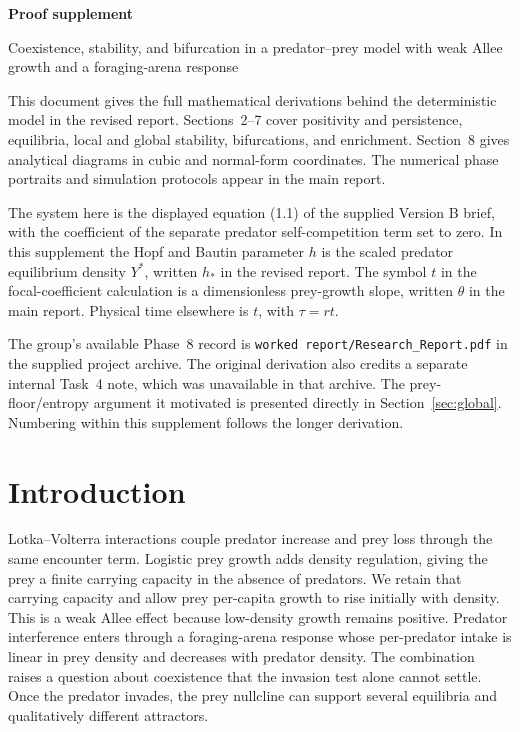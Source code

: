 \documentclass[12pt,a4paper,twoside,fleqn]{article}
\theoremstyle{journal}
\begin{document}
\thispagestyle{plain}
{\raggedright\noindent\LARGE\bfseries Proof supplement\par}
\vspace{.5em}
{\raggedright\noindent\large Coexistence, stability, and bifurcation in a predator--prey model with weak Allee growth and a foraging-arena response\par}
\vspace{1em}{\noindent Project 3H (Version B) \textbar\ Companion to the revised report\par}\vspace{1.1em}

This document gives the full mathematical derivations behind the deterministic model in the revised report. Sections~2--7 cover positivity and persistence, equilibria, local and global stability, bifurcations, and enrichment. Section~8 gives analytical diagrams in cubic and normal-form coordinates. The numerical phase portraits and simulation protocols appear in the main report.

The system here is the displayed equation (1.1) of the supplied Version B brief, with the coefficient of the separate predator self-competition term set to zero. In this supplement the Hopf and Bautin parameter \(h\) is the scaled predator equilibrium density \(Y^*\), written \(h_*\) in the revised report. The symbol \(t\) in the focal-coefficient calculation is a dimensionless prey-growth slope, written \(\theta\) in the main report. Physical time elsewhere is \(t\), with \(\tau=rt\).

The group's available Phase~8 record is \texttt{worked report/Research\_Report.pdf} in the supplied project archive. The original derivation also credits a separate internal Task~4 note, which was unavailable in that archive. The prey-floor/entropy argument it motivated is presented directly in Section~\ref{sec:global}. Numbering within this supplement follows the longer derivation.

\tableofcontents
\clearpage
\section{Introduction}
Lotka--Volterra interactions couple predator increase and prey loss through the same encounter term. Logistic prey growth adds density regulation, giving the prey a finite carrying capacity in the absence of predators. We retain that carrying capacity and allow prey per-capita growth to rise initially with density. This is a weak Allee effect because low-density growth remains positive. Predator interference enters through a foraging-arena response whose per-predator intake is linear in prey density and decreases with predator density. The combination raises a question about coexistence that the invasion test alone cannot settle. Once the predator invades, the prey nullcline can support several equilibria and qualitatively different attractors.
\end{document}
